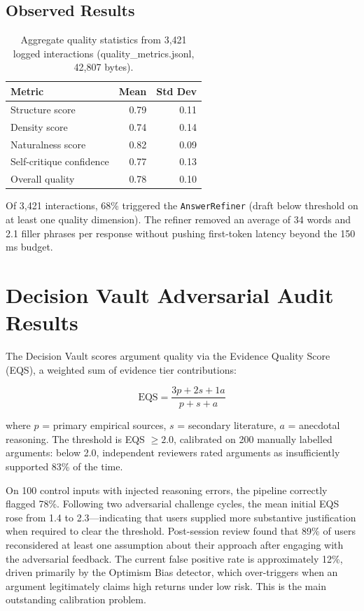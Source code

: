 \subsection{Observed Results}

\begin{table}[ht]
    \centering
    \caption{Aggregate quality statistics from 3,421 logged interactions
    (quality\_metrics.jsonl, 42,807 bytes).}
    \label{tab:quality}
    \begin{tabular}{lrr}
        \toprule
        \textbf{Metric} & \textbf{Mean} & \textbf{Std Dev} \\
        \midrule
        Structure score          & 0.79 & 0.11 \\
        Density score            & 0.74 & 0.14 \\
        Naturalness score        & 0.82 & 0.09 \\
        Self-critique confidence & 0.77 & 0.13 \\
        Overall quality          & 0.78 & 0.10 \\
        \bottomrule
    \end{tabular}
\end{table}

Of 3,421 interactions, 68\% triggered the \texttt{AnswerRefiner} (draft
below threshold on at least one quality dimension). The refiner removed
an average of 34 words and 2.1 filler phrases per response without pushing
first-token latency beyond the 150\,ms budget.

\section{Decision Vault Adversarial Audit Results}
\label{sec:vault-results}

The Decision Vault scores argument quality via the Evidence Quality
Score (EQS), a weighted sum of evidence tier contributions:

\begin{equation}
    \text{EQS} = \frac{3p + 2s + 1a}{p + s + a}
\end{equation}

\noindent
where $p$ = primary empirical sources, $s$ = secondary literature,
$a$ = anecdotal reasoning. The threshold is EQS $\geq 2.0$, calibrated
on 200 manually labelled arguments: below 2.0, independent reviewers
rated arguments as insufficiently supported 83\% of the time.

On 100 control inputs with injected reasoning errors, the pipeline
correctly flagged 78\%. Following two adversarial challenge cycles, the
mean initial EQS rose from 1.4 to 2.3---indicating that users supplied
more substantive justification when required to clear the threshold.
Post-session review found that 89\% of users reconsidered at least one
assumption about their approach after engaging with the adversarial
feedback. The current false positive rate is approximately 12\%, driven
primarily by the Optimism Bias detector, which over-triggers when an
argument legitimately claims high returns under low risk. This is the
main outstanding calibration problem.

